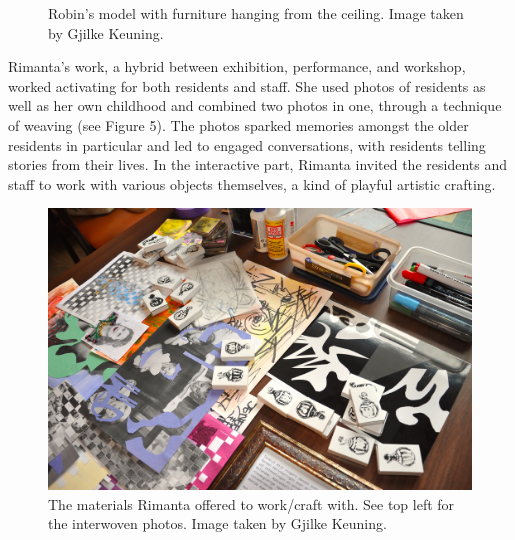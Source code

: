 \documentclass[authordate, empirical]{jote-new-article}
\begin{document}
{\begin{figure}
		\caption{Robin's model with furniture hanging from the ceiling. Image taken by Gjilke Keuning.}



	\end{figure}












	Rimanta's work, a hybrid between exhibition, performance, and workshop, worked activating for both residents and staff. She used photos of residents as well as her own childhood and combined two photos in one, through a technique of weaving (see Figure 5). The photos sparked memories amongst the older residents in particular and led to engaged conversations, with residents telling stories from their lives. In the interactive part, Rimanta invited the residents and staff to work with various objects themselves, a kind of playful artistic crafting.







	\begin{figure}
		\includegraphics[width=\linewidth]{media/fig5.jpeg}

		\caption{The materials Rimanta offered to work/craft with. See top left for the interwoven photos. Image taken by Gjilke Keuning.}



	\end{figure}








}
\end{document}
